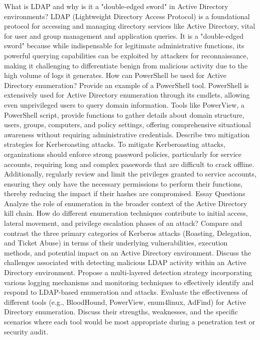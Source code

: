 What is LDAP and why is it a "double-edged sword" in Active Directory environments? LDAP (Lightweight Directory Access Protocol) is a foundational protocol for accessing and managing directory services like Active Directory, vital for user and group management and application queries. It is a "double-edged sword" because while indispensable for legitimate administrative functions, its powerful querying capabilities can be exploited by attackers for reconnaissance, making it challenging to differentiate benign from malicious activity due to the high volume of logs it generates.
How can PowerShell be used for Active Directory enumeration? Provide an example of a PowerShell tool. PowerShell is extensively used for Active Directory enumeration through its cmdlets, allowing even unprivileged users to query domain information. Tools like PowerView, a PowerShell script, provide functions to gather details about domain structure, users, groups, computers, and policy settings, offering comprehensive situational awareness without requiring administrative credentials.
Describe two mitigation strategies for Kerberoasting attacks. To mitigate Kerberoasting attacks, organizations should enforce strong password policies, particularly for service accounts, requiring long and complex passwords that are difficult to crack offline. Additionally, regularly review and limit the privileges granted to service accounts, ensuring they only have the necessary permissions to perform their functions, thereby reducing the impact if their hashes are compromised.
Essay Questions
Analyze the role of enumeration in the broader context of the Active Directory kill chain. How do different enumeration techniques contribute to initial access, lateral movement, and privilege escalation phases of an attack?
Compare and contrast the three primary categories of Kerberos attacks (Roasting, Delegation, and Ticket Abuse) in terms of their underlying vulnerabilities, execution methods, and potential impact on an Active Directory environment.
Discuss the challenges associated with detecting malicious LDAP activity within an Active Directory environment. Propose a multi-layered detection strategy incorporating various logging mechanisms and monitoring techniques to effectively identify and respond to LDAP-based enumeration and attacks.
Evaluate the effectiveness of different tools (e.g., BloodHound, PowerView, enum4linux, AdFind) for Active Directory enumeration. Discuss their strengths, weaknesses, and the specific scenarios where each tool would be most appropriate during a penetration test or security audit.
